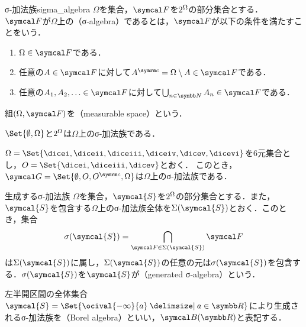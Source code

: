 \documentclass[../../main]{subfiles}
\begin{document}
\begin{definition}{σ‐加法族}{sigma_algebra}
  \(\Omega\)を集合，\(\sigmaalg{F}\)を\(2^{\Omega}\)の部分集合とする．
  \(\sigmaalg{F}\)が\(\Omega\)上の（σ‐algebra）であるとは，\(\sigmaalg{F}\)が以下の条件を満たすことをいう．
  \begin{enumerate}
    \item \(\Omega\in\sigmaalg{F}\)である．
    \item 任意の\(A\in\sigmaalg{F}\)に対して\(\scomp{A}=\Omega\setminus A\in\sigmaalg{F}\)である．
    \item 任意の\(A_1,A_2,\dotsc\in\sigmaalg{F}\)に対して\(\bigcup_{n\in\numset{N}}A_n\in\sigmaalg{F}\)である．
  \end{enumerate}
\end{definition}

組\((\Omega,\sigmaalg{F})\)を（measurable space）という．

\begin{example}
  \(\Set{\emptyset,\Omega}\)と\(2^{\Omega}\)は\(\Omega\)上のσ‐加法族である．
\end{example}

\begin{example}\label{example:dice}
  \(\Omega=\Set{\dicei,\diceii,\diceiii,\diceiv,\dicev,\dicevi}\)を6元集合とし，\(O=\Set{\dicei,\diceiii,\dicev}\)とおく．
  このとき，\(\sigmaalg{G}=\Set{\emptyset,O,\scomp{O},\Omega}\)は\(\Omega\)上のσ‐加法族である．
\end{example}

\begin{definition}{生成するσ‐加法族}{}
  \(\Omega\)を集合，\(\symcal{S}\)を\(2^{\Omega}\)の部分集合とする．また，\(\symcal{S}\)を包含する\(\Omega\)上のσ‐加法族全体を\(\Sigma(\symcal{S})\)とおく．このとき，集合
  \[
    \sigmagen{\symcal{S}} = \bigcap_{\sigmaalg{F}\in\Sigma(\symcal{S})}\sigmaalg{F}
  \]
  は\(\Sigma(\symcal{S})\)に属し，\(\Sigma(\symcal{S})\)の任意の元は\(\sigmagen{\symcal{S}}\)を包含する．\(\sigmagen{\symcal{S}}\)を\(\symcal{S}\)が（generated σ‐algebra）という．
\end{definition}

\begin{example}[ボレル集合族]
  左半開区間の全体集合\(\symcal{S}=\Set{\ocival{-\infty}{a}\given a\in\numset{R}}\)により生成されるσ‐加法族を（Borel algebra）といい，\(\borelset{\numset{R}}\)と表記する．
\end{example}
\end{document}
